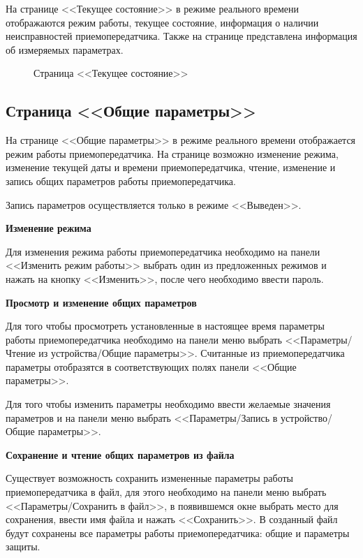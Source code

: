 На странице <<Текущее состояние>> в режиме реального времени отображаются режим работы, текущее состояние, информация о наличии неисправностей приемопередатчика. Также на странице представлена информация об измеряемых параметрах.

\begin{figure}[H]
	
	\caption{Страница <<Текущее состояние>>}
	\label{fig:configurator_state}
\end{figure}


\subsection{Страница <<Общие параметры>>}	\label{ssec:configurator_param_glb}

На странице <<Общие параметры>> в режиме реального времени отображается режим работы приемопередатчика. На странице возможно изменение режима, изменение текущей даты и времени приемопередатчика, чтение, изменение и запись общих параметров работы приемопередатчика.

Запись параметров осуществляется только в режиме <<Выведен>>. 
\newline

\textbf{Изменение режима}

Для изменения режима работы приемопередатчика необходимо на панели <<Изменить режим работы>> выбрать один из предложенных режимов и нажать на кнопку <<Изменить>>, после чего необходимо ввести пароль.
\newline

\textbf{Просмотр и изменение общих параметров}

Для того чтобы просмотреть установленные в настоящее время параметры работы приемопередатчика необходимо на панели меню выбрать <<Параметры/Чтение из устройства/Общие параметры>>. Считанные из приемопередатчика параметры отобразятся в соответствующих полях панели <<Общие параметры>>.

Для того чтобы изменить параметры необходимо ввести желаемые значения параметров и на панели меню выбрать <<Параметры/Запись в устройство/Общие параметры>>.
\newline

\textbf{Сохранение и чтение общих параметров из файла}

Существует возможность сохранить измененные параметры работы приемопередатчика в файл, для этого необходимо на панели меню выбрать <<Параметры/Сохранить в файл>>, в появившемся окне выбрать место для сохранения, ввести имя файла и нажать <<Сохранить>>. В созданный файл будут сохранены все параметры работы приемопередатчика: общие и параметры защиты.

